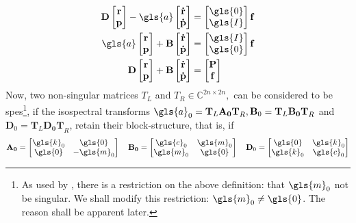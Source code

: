 \begin{align}
\label{eqn:stsp_g}
	\mathbf{D}
	\begin{bmatrix}
		\mathbf{r}\\
		\mathbf{p}
	\end{bmatrix} - \gls{a}
	\begin{bmatrix}
		\mathbf{\dot{r}}\\
		\mathbf{\dot{p}}
	\end{bmatrix} &= 
	\begin{bmatrix}
		\gls{0}\\
		\gls{I}
	\end{bmatrix}\mathbf{f}\\
	\gls{a}
	\begin{bmatrix}
		\mathbf{r}\\
		\mathbf{p}
	\end{bmatrix} + \mathbf{B}
	\begin{bmatrix}
		\mathbf{\dot{r}}\\
		\mathbf{\dot{p}}
	\end{bmatrix} &= 
	\begin{bmatrix}
		\gls{I}\\
		\gls{0}
	\end{bmatrix}\mathbf{f}\\
	\mathbf{D}
	\begin{bmatrix}
		\mathbf{r}\\
		\mathbf{p}
	\end{bmatrix} + \mathbf{B}\begin{bmatrix}
		\mathbf{\dot{r}}\\
		\mathbf{\dot{p}}
	\end{bmatrix} &= 
	\begin{bmatrix}
		\mathbf{P}\\
		\mathbf{f}
	\end{bmatrix}
\end{align}
Now, two non-singular matrices $T_L$ and $T_R \in \mathbb{C}^{2n \times 2n},$ 
can be considered to be \glspl{spe}\footnote{As 
used by \citet{GARVEY2002885,GARVEY2002911}, there is a restriction on the 
above definition: that $\gls{m}_0$ not be singular. We shall modify this 
restriction: $\gls{m}_0 \neq \gls{0}$. The reason shall be apparent later.},
if the isospectral transforms $\gls{a}_0 = \mathbf{T}_L\mathbf{A_0T}_R, 
\mathbf{B}_0 = \mathbf{T}_L\mathbf{B_0T}_R$ and $\mathbf{D}_0 =
\mathbf{T}_L\mathbf{D_0T}_R$, retain their block-structure, that is, if
\begin{align}
	\mathbf{A_0} = \begin{bmatrix}
	\gls{k}_0 & \gls{0}\\
	\gls{0} & -\gls{m}_0
	\end{bmatrix} \quad
	\mathbf{B_0} = \begin{bmatrix}
	\gls{c}_0 & \gls{m}_0\\
	\gls{m}_0 & \gls{0}
	\end{bmatrix}\quad
	\mathbf{D}_0 = \begin{bmatrix}
	\gls{0} & \gls{k}_0\\
	\gls{k}_0 & \gls{c}_0
	\end{bmatrix}
\end{align}
